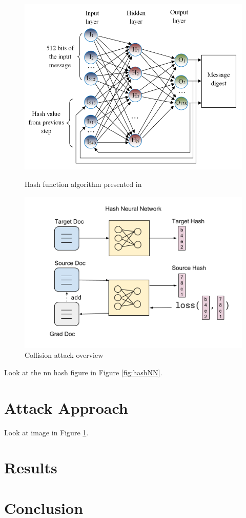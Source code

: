 \documentclass{article}
\begin{document}
\begin{figure}[t]
    \centering
    \begin{minipage}{.5\textwidth}
        \centering
        \includegraphics[width=\textwidth]{hash_nn_architecture}
        \caption{Hash function algorithm presented in \cite{hash1}}
        \label{fig:hashNN}
    \end{minipage}%
    \begin{minipage}{.5\textwidth}
        \centering
        \includegraphics[width=\textwidth]{model_diagram}
        \caption{Collision attack overview} 
        \label{fig:model}
    \end{minipage}
\end{figure}



Look at the nn hash figure in Figure \ref{fig:hashNN}.

\section{Attack Approach}

Look at image in Figure \ref{fig:model}.

\section{Results}

\section{Conclusion}


 
\end{document}

